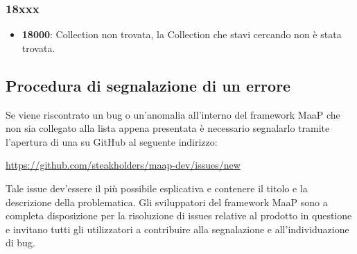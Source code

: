 \subsubsection{18xxx}

\begin{itemize}

	\item \textbf{18000}: Collection non trovata, la Collection che stavi cercando non è stata trovata.

\end{itemize}

\subsection{Procedura di segnalazione di un errore}

Se viene riscontrato un bug o un'anomalia all'interno del framework MaaP che non sia collegato alla lista appena presentata è necessario segnalarlo tramite l'apertura di una  su GitHub al seguente indirizzo:

\centerline{\url{https://github.com/steakholders/maap-dev/issues/new}}

Tale issue dev'essere il più possibile esplicativa e contenere il titolo e la descrizione della problematica. Gli sviluppatori del framework MaaP sono a completa disposizione per la risoluzione di issues relative al prodotto in questione e invitano tutti gli utilizzatori a contribuire alla segnalazione e all'individuazione di bug.
